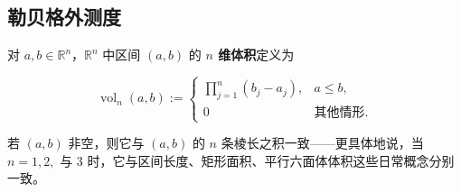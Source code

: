 \subsection*{勒贝格外测度}

对 $ a, b \in \mathbb{R}^n $，$ \mathbb{R}^n $ 中区间 $ (a, b) $ 的 \textbf{$ n $ 维体积}定义为

\begin{equation*}
\operatorname{vol}_n(a,b) := \begin{cases} \prod_{j=1}^{n} (b_j - a_j) , & a \le b , \\ 0 & \text{其他情形} . \end{cases}
\end{equation*}

若 $ (a, b) $ 非空，则它与 $ (a, b) $ 的 $ n $ 条棱长之积一致——更具体地说，当 $ n = 1, 2, \text{ 与 } 3 $ 时，它与区间长度、矩形面积、平行六面体体积这些日常概念分别一致。


